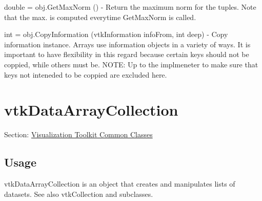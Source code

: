 \begin{DoxyItemize}
\item {\ttfamily double = obj.\-Get\-Max\-Norm ()} -\/ Return the maximum norm for the tuples. Note that the max. is computed everytime Get\-Max\-Norm is called.  
\item {\ttfamily int = obj.\-Copy\-Information (vtk\-Information info\-From, int deep)} -\/ Copy information instance. Arrays use information objects in a variety of ways. It is important to have flexibility in this regard because certain keys should not be coppied, while others must be. N\-O\-T\-E\-: Up to the implmeneter to make sure that keys not inteneded to be coppied are excluded here.  
\end{DoxyItemize}\hypertarget{vtkcommon_vtkdataarraycollection}{}\section{vtk\-Data\-Array\-Collection}\label{vtkcommon_vtkdataarraycollection}
Section\-: \hyperlink{sec_vtkcommon}{Visualization Toolkit Common Classes} \hypertarget{vtkwidgets_vtkxyplotwidget_Usage}{}\subsection{Usage}\label{vtkwidgets_vtkxyplotwidget_Usage}
vtk\-Data\-Array\-Collection is an object that creates and manipulates lists of datasets. See also vtk\-Collection and subclasses.

